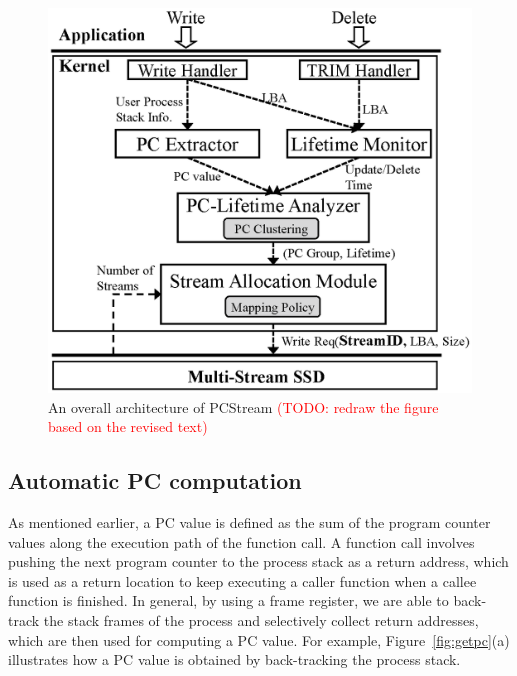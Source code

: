 \begin{figure}[t]
	\centering
	\includegraphics[width=0.8\linewidth]{figure/architecture2}
	\caption{An overall architecture of {\sf PCStream}
	\textcolor{red}{(TODO: redraw the figure based on the revised text)}}
	\label{fig:architecture}
	\vspace{-15pt}
\end{figure}

\vspace{-5pt}
\subsection{Automatic PC computation}
As mentioned earlier, a PC value is defined as the sum of the program counter
values along the execution path of the function call.  A function call involves
pushing the next program counter to the process stack as a return address,
which  is used as a return location to keep executing a caller function when a
callee function is finished.  In general, by using a frame register, we are
able to back-track the stack frames of the process and selectively collect
return addresses, which are then used for computing a PC value. For example,
Figure~\ref{fig:getpc}(a) illustrates how a PC value is obtained by
back-tracking the process stack.

